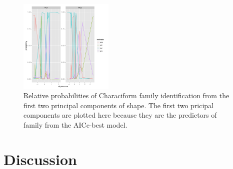 \documentclass{article}\usepackage{graphicx, color}
\begin{document}
\begin{figure}[p]
  \centering
  \includegraphics[width = 0.4\textwidth, keepaspectratio = true]{figure/logistic-plots}
  \caption{Relative probabilities of Characiform family identification from the first two principal components of shape. The first two pricipal components are plotted here because they are the predictors of family from the AICc-best model.}
  \label{fig:fish-logistic}
\end{figure}


\section{Discussion}
\end{document}
